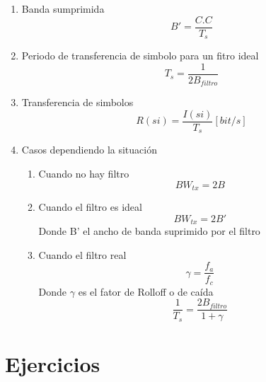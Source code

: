 \documentclass[10pt]{article}
\begin{document}
	\begin{enumerate}
			\item Banda sumprimida
		\begin{equation}
			B'=\frac{C.C}{T_s}
		\end{equation}
		\item  Periodo de transferencia de simbolo para un fitro ideal
		\begin{equation}
			T_s=\frac{1}{2B_{filtro}}
		\end{equation}
		\item Transferencia de simbolos
		\begin{equation}
			R(si)=\frac{I(si)}{T_s}[bit/s]
		\end{equation}
		\item Casos dependiendo la situación
		\begin{enumerate}
			\item  Cuando no hay filtro
			\begin{equation}
				BW_{tx}=2B
			\end{equation}
			\item  Cuando el filtro es ideal
			\begin{equation}
				BW_{tx}=2B'
			\end{equation}
			Donde B' el ancho de banda suprimido por el filtro

			\item Cuando el filtro real
		\begin{equation}
				\gamma =\frac{f_a}{f_c}
			\end{equation}
			Donde $\gamma$ es el fator de Rolloff o de caída
			\begin{equation}
				\frac{1}{T_s} =\frac{2B_{filtro}}{1+\gamma}
			\end{equation}
		
			\end{enumerate}
	
	\end{enumerate}
	
\section{Ejercicios}
\end{document}
